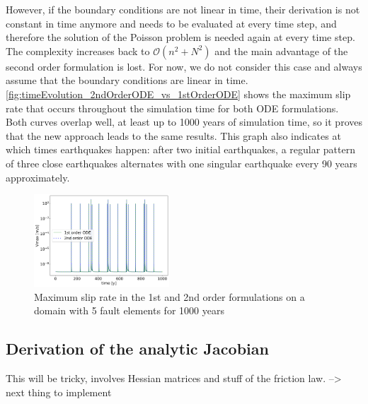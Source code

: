 However, if the boundary conditions are not linear in time, their derivation is not constant in time anymore and needs to be evaluated at every time step, and therefore the solution of the Poisson problem is needed again at every time step. The complexity increases back to $\mathcal{O}\left(n^2+N^2\right)$ and the main advantage of the second order formulation is lost. For now, we do not consider this case and always assume that the boundary conditions are linear in time.  \\
\autoref{fig:timeEvolution_2ndOrderODE_vs_1stOrderODE} shows the maximum slip rate that occurs throughout the simulation time for both ODE formulations. Both curves overlap well, at least up to 1000 years of simulation time, so it proves that the new approach leads to the same results. This graph also indicates at which times earthquakes happen: after two initial earthquakes, a regular pattern of three close earthquakes alternates with one singular earthquake every 90 years approximately.
\begin{figure}[H]
	\centering
	\includegraphics[width=0.45\textwidth]{images/TANDEMtimeEvolutionVExtendedODE1stvs2ndOrder.png}
	\caption{Maximum slip rate in the 1st and 2nd order formulations on a domain with 5 fault elements for 1000 years} 
	\label{fig:timeEvolution_2ndOrderODE_vs_1stOrderODE}
\end{figure}

\subsection{Derivation of the analytic Jacobian}
This will be tricky, involves Hessian matrices and stuff of the friction law. --> next thing to implement

